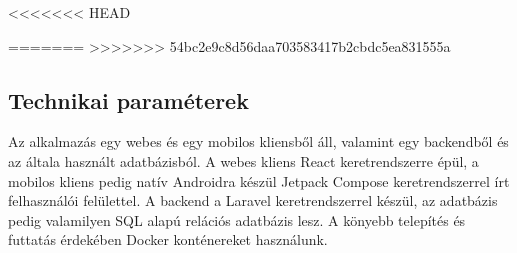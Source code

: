 <<<<<<< HEAD


=======
>>>>>>> 54bc2e9c8d56daa703583417b2cbdc5ea831555a
\subsection{Technikai paraméterek}

Az alkalmazás egy webes és egy mobilos kliensből áll, valamint egy backendből és az általa használt adatbázisból. A webes kliens  React keretrendszerre épül, a mobilos kliens pedig natív Androidra készül Jetpack Compose keretrendszerrel írt felhasználói felülettel. A backend a Laravel keretrendszerrel készül, az adatbázis pedig valamilyen SQL alapú relációs adatbázis lesz. A könyebb telepítés és futtatás érdekében Docker konténereket használunk.